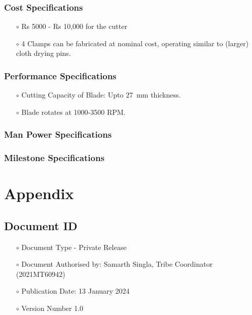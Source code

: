 \documentclass[12pt]{article}
\begin{document}
\subsubsection{Cost Specifications}
\begin{itemize}
    \item[$\scriptstyle\circ$] Rs 5000 - Rs 10,000 for the cutter
    \item[$\scriptstyle\circ$] 4 Clamps can be fabricated at nominal cost, operating similar to (larger) cloth drying pins. 
\end{itemize}
\subsubsection{Performance Specifications}
\begin{itemize}
    \item[$\scriptstyle\circ$] Cutting Capacity of Blade: Upto \SI{27}{\milli\meter} thickness. 
    \item[$\scriptstyle\circ$] Blade rotates at 1000-3500 RPM. \cite{noauthor_fabric_nodate} \cite{noauthor_yj-d108_nodate}
\end{itemize}
\subsubsection{Man Power Specifications}

\subsubsection{Milestone Specifications}





\newpage

\printglossary
\appendix
% 


\section{Appendix}
\subsection{Document ID}
\begin{itemize}
    \item[$\scriptstyle\circ$] Document Type - Private Release
    \item[$\scriptstyle\circ$] Document Authorised by: Samarth Singla, Tribe Coordinator (2021MT60942)
    \item[$\scriptstyle\circ$] Publication Date: 13 January 2024
    \item[$\scriptstyle\circ$] Version Number 1.0
\end{itemize}
\end{document}
